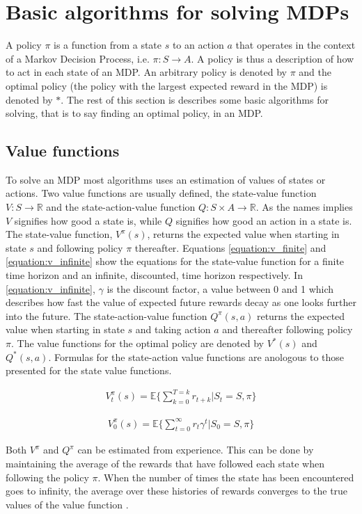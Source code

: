 \section{Basic algorithms for solving MDPs}

A policy $\pi$ is a function from a state $s$ to an action $a$ that operates in
the context of a Markov Decision Process, i.e. $\pi \colon S \to A$. A policy
is thus a description of how to act in each state of an MDP. An arbitrary
policy is denoted by $\pi$ and the optimal policy (the policy with the largest
expected reward in the MDP) is denoted by $*$. The rest of this section is
describes some basic algorithms for solving, that is to say finding an optimal
policy, in an MDP.

\subsection{Value functions}

To solve an MDP most algorithms uses an estimation of values of states or
actions. Two value functions are usually defined, the state-value function $V :
S \to \mathbb R$ and the state-action-value function $Q : S \times A \to
\mathbb R$. As the names implies $V$ signifies how good a state is, while $Q$
signifies how good an action in a state is. The state-value function,
$V^\pi(s)$, returns the expected value when starting in state $s$ and following
policy $\pi$ thereafter. Equations \eqref{equation:v_finite} and \eqref{equation:v_infinite} show the equations for the state-value function for a finite time horizon and an infinite, discounted, time horizon respectively. In \eqref{equation:v_infinite}, $\gamma$ is the discount factor, a value between 0 and 1 which describes how fast the value of expected future rewards decay as one looks further into the future. The state-action-value function $Q^\pi(s, a)$ returns
the expected value when starting in state $s$ and taking action $a$ and
thereafter following policy $\pi$. The value functions for the optimal policy
are denoted by $V^*(s)$ and $Q^*(s, a)$. Formulas for the state-action value functions are anologous to those presented for the state value functions. 

\begin{align}
\label{equation:v_finite}
V_t^\pi(s) = \mathbb{E} \{ \sum_{k=0}^{T=k} r_{t+k} | S_t = S, \pi \}
\end{align}

\begin{align}
\label{equation:v_infinite}
V_{0}^\pi(s) = \mathbb{E} \{ \sum_{t=0}^\infty r_{t}\gamma^t | S_0 = S,\pi \}
\end{align}

Both $V^\pi$ and $Q^\pi$ can be estimated from experience. This can be done by
maintaining the average of the rewards that have followed each state when
following the policy $\pi$. When the number of times the state has been
encountered goes to infinity, the average over these histories of rewards
converges to the true values of the value function
\parencite{barto1998reinforcement}.




